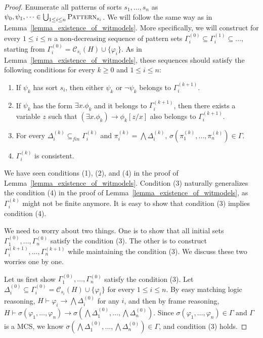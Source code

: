 \documentclass[acmsmall]{acmart}
\theoremstyle{acmdefinition}
\newcommand{\imp}{\to}
\newcommand{\Pattern}{\textnormal{\textsc{Pattern}}}
\newcommand{\Gammai}[1]{\Gamma_i^{(#1)}}
\newcommand{\Deltai}[1]{\Delta_i^{(#1)}}
\newcommand{\pii}[1]{\pi_i^{(#1)}}
\newcommand{\CC}{\mathcal{C}}
\newcommand{\ddd}{,\dots,}
\newcommand{\fin}{\mathit{fin}}
\begin{document}
\begin{proof}
Enumerate all patterns of sorts $s_1 \ddd s_n$
as $\psi_0,\psi_1,\dots \in \bigcup_{1 \le i \le n} \Pattern_{s_i}$.
We will follow the same way as in
Lemma~\ref{lemma_existence_of_witmodels}.
More specifically, we will construct for every $1 \le i \le n$
a non-decreasing sequence of pattern sets
$\Gammai{0} \subseteq \Gammai{1} \subseteq \dots$,
starting from $\Gammai{0} = \CC_{s_i}(H) \cup \{ \varphi_i \}$.
As in Lemma~\ref{lemma_existence_of_witmodels},
these sequences should satisfy the following conditions
for every $k \ge 0$ and $1 \le i \le n$:
\begin{enumerate}
\item If $\psi_k$ has sort $s_i$, 
      then either $\psi_k$ or $\neg \psi_k$ belongs to $\Gammai{k+1}$.
\item If $\psi_k$ has the form $\exists x . \phi_k$ and
it belongs to $\Gammai{k+1}$, then there exists
a variable $z$ such that
$(\exists x . \phi_k) \imp \phi_k[z/x]$ also belongs to 
$\Gammai{k+1}$.
\item For every $\Deltai{k} \subseteq_\fin \Gammai{k}$
            and $\pii{k} = \bigwedge \Deltai{k}$,
            $\sigma(\pi_1^{(k)} \ddd \pi_n^{(k)}) \in \Gamma$.
\item $\Gammai{k}$ is consistent.
\end{enumerate}

We have seen conditions (1), (2), and (4)
in the proof of Lemma~\ref{lemma_existence_of_witmodels}.
Condition (3) naturally generalizes 
the condition (4) in the proof of Lemma~\ref{lemma_existence_of_witmodels},
as $\Gamma_i^{(k)}$ might not be finite anymore.
It is easy to show that condition (3) implies condition (4).

We need to worry about two things.
One is to show that all initial sets
$\Gamma_1^{(0)} \ddd \Gamma_n^{(0)}$ satisfy the condition (3).
The other is to construct 
$\Gamma_i^{(k+1)} \ddd \Gamma_n^{(k+1)}$
while maintaining the condition (3).
We discuss these two worries one by one.

Let us first show 
$\Gamma_1^{(0)} \ddd \Gamma_n^{(0)}$ satisfy the condition (3).
Let $\Delta_i^{(0)} \subseteq \Gamma_i^{(0)} = \CC_{s_i}(H) \cup \{\varphi_i\}$ 
for every $1 \le i \le n$.
By easy matching logic reasoning,
$H \vdash \varphi_i \imp \bigwedge \Delta_i^{(0)}$ for any $i$,
and then by frame reasoning,
$H \vdash \sigma(\varphi_1 \ddd \varphi_n) 
 \imp \sigma(\bigwedge \Delta_1^{(0)} \ddd \bigwedge \Delta_n^{(0)})$.
Since $\sigma(\varphi_1 \ddd \varphi_n) \in \Gamma$
and $\Gamma$ is a MCS,
we know
$\sigma(\bigwedge \Delta_1^{(0)} \ddd \bigwedge \Delta_n^{(0)}) \in \Gamma$,
and condition (3) holds.


\end{proof}
\end{document}
